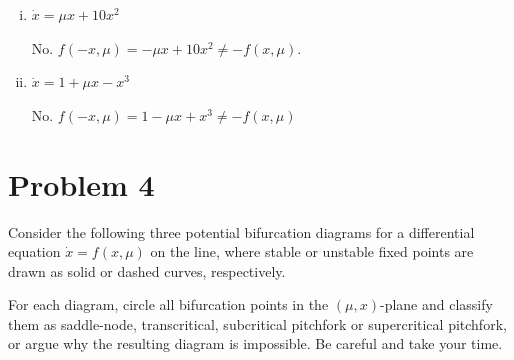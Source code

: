 \documentclass[12pt]{article}
\begin{document}
\begin{enumerate}[(a)]
\begin{enumerate}[(i)]
              \item \quad $\dot{x} = \mu x + 10 x^2$

                    \color{blue}
                    No. $f(-x, \mu) = -\mu x + 10x^2 \neq -f(x, \mu)$.
                    \color{black}

              \item \quad $\dot{x} = 1 + \mu x - x^3$

                    \color{blue}
                    No. $f(-x, \mu) = 1 -\mu x + x^3 \neq -f(x, \mu)$
                    \color{black}
          \end{enumerate}
\end{enumerate}


\pagebreak
\section*{Problem 4}

Consider the following three potential bifurcation diagrams for a differential equation $\dot{x}=f(x,\mu)$ on the line, where stable or unstable fixed points are drawn as solid or dashed curves, respectively.

For each diagram, circle all bifurcation points in the $(\mu,x)$-plane and classify them as saddle-node, transcritical, subcritical pitchfork or supercritical pitchfork, or argue why the resulting diagram is impossible. Be careful and take your time.
\end{document}

